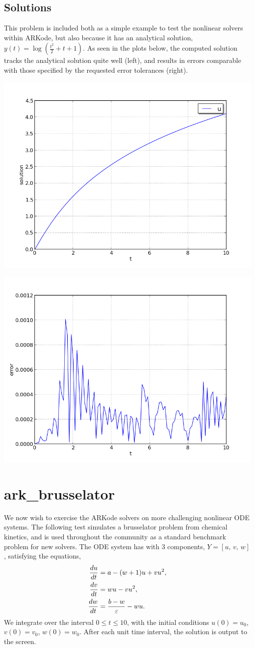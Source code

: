 \documentclass[letterpaper,10pt,english]{sphinxmanual}
\begin{document}
\subsection{Solutions}
\label{c_serial:id4}
This problem is included both as a simple example to test the
nonlinear solvers within ARKode, but also because it has an analytical
solution, $y(t) = \log\left(\frac{t^2}{2} + t + 1\right)$.  As
seen in the plots below, the computed solution tracks the analytical solution
quite well (left), and results in errors comparable with those
specified by the requested error tolerances (right).

\includegraphics[width=0.450\linewidth]{plot-ark_analytic_nonlin.png}

\includegraphics[width=0.450\linewidth]{plot-ark_analytic_nonlin_error.png}


\section{ark\_brusselator}
\label{c_serial:ark-brusselator}\label{c_serial:id5}
We now wish to exercise the ARKode solvers on more challenging
nonlinear ODE systems.  The following test simulates a brusselator
problem from chemical kinetics, and is used throughout the community
as a standard benchmark problem for new solvers.  The ODE system has
with 3 components, $Y = [u,\, v,\, w]$, satisfying the equations,
\begin{gather}
\begin{split}\frac{du}{dt} &= a - (w+1)u + v u^2, \\
\frac{dv}{dt} &= w u - v u^2, \\
\frac{dw}{dt} &= \frac{b-w}{\varepsilon} - w u.\end{split}\notag
\end{gather}
We integrate over the interval $0 \le t \le 10$, with the
initial conditions $u(0) = u_0$, $v(0) = v_0$, $w(0) = w_0$.
After each unit time interval, the solution is output to the screen.
\end{document}
